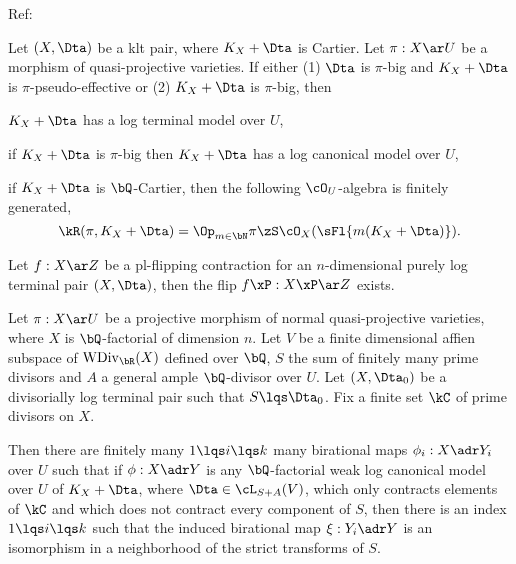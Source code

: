 \documentclass[article, a4paper, twoside]{universal}
\begin{document}
\confighead{}{}{}



Ref:~\cite{BCHM2010}

\begin{thm}
	Let $(X,\Dta)$ be a klt pair, where $K_{X}+\Dta$ is Cartier. Let $\pi:X\ar U$ be a morphism of quasi-projective varieties. If either (1) $\Dta$ is $\pi$-big and $K_{X}+\Dta$ is $\pi$-pseudo-effective or (2) $K_{X}+\Dta$ is $\pi$-big, then
	\begin{itm}
		\item $K_{X}+\Dta$ has a log terminal model over $U$,
		\item if $K_{X}+\Dta$ is $\pi$-big then $K_{X}+\Dta$ has a log canonical model over $U$,
		\item if $K_{X}+\Dta$ is $\bQ$-Cartier, then the following $\cO_{U}$-algebra is finitely generated,
		\[
			\kR(\pi,K_{X}+\Dta)=\Op_{m\in\bN}\pi\zS\cO_{X}(\sFl{m(K_{X}+\Dta)}).
		\]
	\end{itm}
\end{thm}


\begin{thm}[$A_{n}$]
	Let $f:X\ar Z$ be a pl-flipping contraction for an $n$-dimensional purely log terminal pair $(X,\Dta)$, then the flip $f\xP:X\xP\ar Z$ exists.
\end{thm}

\begin{thm}[$B_{n}$]
	Let $\pi:X\ar U$ be a projective morphism of normal quasi-projective varieties, where $X$ is $\bQ$-factorial of dimension $n$. Let $V$ be a finite dimensional affien subspace of $\mathrm{WDiv}_{\bR}(X)$ defined over $\bQ$, $S$ the sum of finitely many prime divisors and $A$ a general ample $\bQ$-divisor over $U$. Let $(X,\Dta_{0})$ be a divisorially log terminal pair such that $S\lqs\Dta_{0}$. Fix a finite set $\kC$ of prime divisors on $X$.

	Then there are finitely many $1\lqs i\lqs k$ many birational maps $\phi_{i}:X\adr Y_{i}$ over $U$ such that if $\phi:X\adr Y$ is any $\bQ$-factorial weak log canonical model over $U$ of $K_{X}+\Dta$, where $\Dta\in\cL_{S+A}(V)$, which only contracts elements of $\kC$ and which does not contract every component of $S$, then there is an index $1\lqs i\lqs k$ such that the induced birational map $\xi:Y_{i}\adr Y$ is an isomorphism in a neighborhood of the strict transforms of $S$.
\end{thm}

\printref
\end{document}
